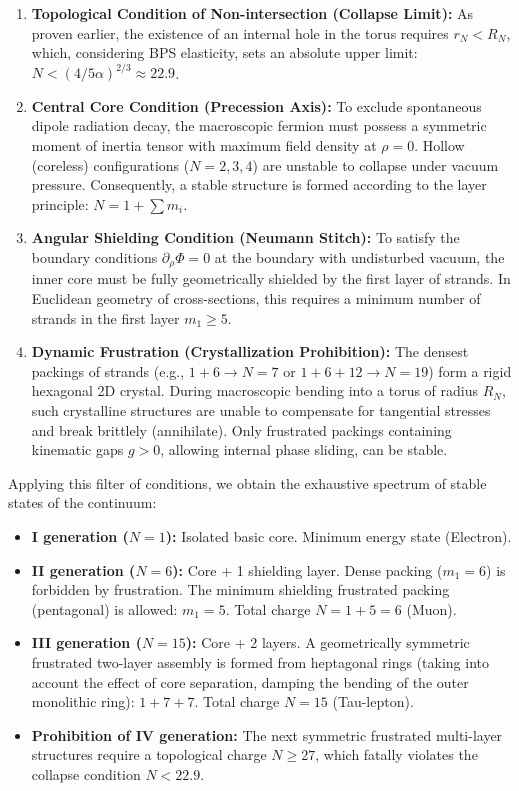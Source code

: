 \documentclass[11pt,a4paper]{article}
\begin{document}
\begin{enumerate}
	\item \textbf{Topological Condition of Non-intersection (Collapse Limit):} As proven earlier, the existence of an internal hole in the torus requires $r_N < R_N$, which, considering BPS elasticity, sets an absolute upper limit: $N < (4 / 5\alpha)^{2/3} \approx 22.9$.
	
	\item \textbf{Central Core Condition (Precession Axis):} To exclude spontaneous dipole radiation decay, the macroscopic fermion must possess a symmetric moment of inertia tensor with maximum field density at $\rho = 0$. Hollow (coreless) configurations ($N=2, 3, 4$) are unstable to collapse under vacuum pressure. Consequently, a stable structure is formed according to the layer principle: $N = 1 + \sum m_i$.
	
	\item \textbf{Angular Shielding Condition (Neumann Stitch):} To satisfy the boundary conditions $\partial_\rho \Phi = 0$ at the boundary with undisturbed vacuum, the inner core must be fully geometrically shielded by the first layer of strands. In Euclidean geometry of cross-sections, this requires a minimum number of strands in the first layer $m_1 \ge 5$.
	
	\item \textbf{Dynamic Frustration (Crystallization Prohibition):} The densest packings of strands (e.g., $1+6 \to N=7$ or $1+6+12 \to N=19$) form a rigid hexagonal 2D crystal. During macroscopic bending into a torus of radius $R_N$, such crystalline structures are unable to compensate for tangential stresses and break brittlely (annihilate). Only frustrated packings containing kinematic gaps $g > 0$, allowing internal phase sliding, can be stable.
\end{enumerate}

Applying this filter of conditions, we obtain the exhaustive spectrum of stable states of the continuum:
\begin{itemize}
	\item \textbf{I generation ($N=1$):} Isolated basic core. Minimum energy state (Electron).
	\item \textbf{II generation ($N=6$):} Core + 1 shielding layer. Dense packing ($m_1=6$) is forbidden by frustration. The minimum shielding frustrated packing (pentagonal) is allowed: $m_1 = 5$. Total charge $N = 1 + 5 = 6$ (Muon).
	\item \textbf{III generation ($N=15$):} Core + 2 layers. A geometrically symmetric frustrated two-layer assembly is formed from heptagonal rings (taking into account the effect of core separation, damping the bending of the outer monolithic ring): $1 + 7 + 7$. Total charge $N = 15$ (Tau-lepton).
	\item \textbf{Prohibition of IV generation:} The next symmetric frustrated multi-layer structures require a topological charge $N \ge 27$, which fatally violates the collapse condition $N < 22.9$.
\end{itemize}
\end{document}
